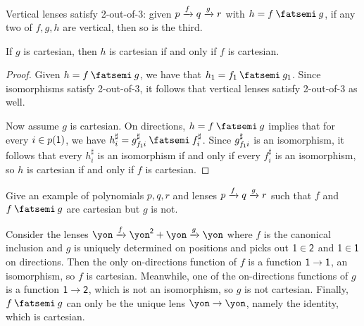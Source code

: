 \documentclass[Book-Poly]{subfiles}
\begin{document}
\begin{proposition}
Vertical lenses satisfy 2-out-of-3: given $p\xrightarrow{f}q\xrightarrow{g}r$ with $h = f \then g$, if any two of $f,g,h$ are vertical, then so is the third.

If $g$ is cartesian, then $h$ is cartesian if and only if $f$ is cartesian.
\end{proposition}
\begin{proof}
Given $h = f \then g$, we have that $h_\1 = f_\1 \then g_\1$.
Since isomorphisms satisfy 2-out-of-3, it follows that vertical lenses satisfy 2-out-of-3 as well.

Now assume $g$ is cartesian.
On directions, $h = f \then g$ implies that for every $i \in p(\textsf{1})$, we have $h^\sharp_i = g^\sharp_{f_\1i} \then f^\sharp_i$.
Since $g^\sharp_{f_{\textsf{1}}i}$ is an isomorphism, it follows that every $h^\sharp_i$ is an isomorphism if and only if every $f^\sharp_i$ is an isomorphism, so $h$ is cartesian if and only if $f$ is cartesian.
\end{proof}

\begin{exercise}
Give an example of polynomials $p,q,r$ and lenses $p\xrightarrow{f}q\xrightarrow{g}r$ such that $f$ and $f \then g$ are cartesian but $g$ is not.
\begin{solution}
Consider the lenses $\yon \To{f} \yon^\2 + \yon \To{g} \yon$ where $f$ is the canonical inclusion and $g$ is uniquely determined on positions and picks out $1 \in \textsf{2}$ and $1 \in \textsf{1}$ on directions.
Then the only on-directions function of $f$ is a function $\textsf{1} \to \textsf{1}$, an isomorphism, so $f$ is cartesian.
Meanwhile, one of the on-directions functions of $g$ is a function $\textsf{1} \to \textsf{2}$, which is not an isomorphism, so $g$ is not cartesian.
Finally, $f \then g$ can only be the unique lens $\yon \to \yon$, namely the identity, which is cartesian.
\end{solution}
\end{exercise}
\end{document}
